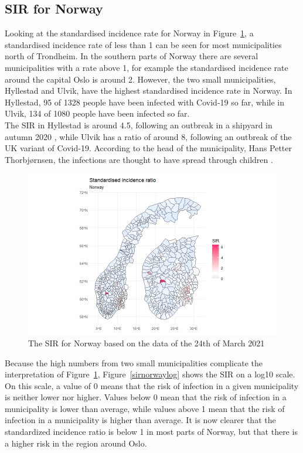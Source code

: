 \subsection{SIR for Norway}
Looking at the standardised incidence rate for Norway in Figure~\ref{sirnorway}, a standardised incidence rate of less than 1 can be seen for most municipalities north of Trondheim. In the southern parts of Norway there are several municipalities with a rate above 1, for example the standardised incidence rate around the capital Oslo is around 2. However, the two small municipalities, Hyllestad and Ulvik, have the highest standardised incidence rate in Norway. In Hyllestad, 95 of 1328 people have been infected with Covid-19 so far, while in Ulvik, 134 of 1080 people have been infected so far. \\
The SIR in Hyllestad is around 4.5, following an outbreak in a shipyard in autumn 2020 \cite{newspaper1}, while Ulvik has a ratio of around 8, following an outbreak of the UK variant of Covid-19. According to the head of the municipality, Hans Petter Thorbjørnsen, the infections are thought to have spread through children \cite{newspaper2}.
%   
\begin{figure}[H]
  \centering
  \includegraphics[width = 1.2\textwidth]{sir_norway.png}
  \caption{The SIR for Norway based on the data of the 24th of March 2021}
  \label{sirnorway}
\end{figure}
Because the high numbers from two small municipalities complicate the interpretation of Figure~\ref{sirnorway}, Figure~\ref{sirnorwaylog} shows the SIR on a log10 scale. On this scale, a value of 0 means that the risk of infection in a given municipality is neither lower nor higher. Values below 0 mean that the risk of infection in a municipality is lower than average, while values above 1 mean that the risk of infection in a municipality is higher than average. It is now clearer that the standardized incidence ratio is below 1 in most parts of Norway, but that there is a higher risk in the region around Oslo.
